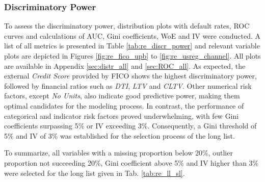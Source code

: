 \subsubsection{Discriminatory Power}
To assess the discriminatory power, distribution plots with default rates, ROC curves and calculations of AUC, Gini coefficients, WoE and IV were conducted. A list of all metrics is presented in Table \ref{tab:re_discr_power} and relevant variable plots are depicted in Figures \ref{fig:re_fico_upb} to \ref{fig:re_usreg_channel}. All plots are available in Appendix \ref{sec:distr_all} and \ref{sec:ROC_all}. As expected, the external \emph{Credit Score} provided by FICO shows the highest discriminatory power, followed by financial ratios such as \emph{DTI}, \emph{LTV} and \emph{CLTV}. Other numerical risk factors, except \emph{No Units}, also indicate good predictive power, making them optimal candidates for the modeling process. In contrast,  the performance of categorical and indicator risk factors proved underwhelming, with few Gini coefficients surpassing 5\% or IV exceeding 3\%. Consequently, a Gini threshold of 5\% and IV of 3\% was established for the selection process of the long list.

To summarize, all variables with a missing proportion below 20\%, outlier proportion not succeeding 20\%, Gini coefficient above 5\% and IV higher than 3\% were selected for the long list given in Tab. \ref{tab:re_ll_sl}. 

\newpage

